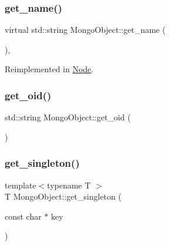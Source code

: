 \mbox{\label{class_mongo_object_abd49d2dcea0ce5f49ebe9a8a9df97164}} 
\subsubsection{\texorpdfstring{get\+\_\+name()}{get\_name()}}
{\footnotesize\ttfamily virtual std\+::string Mongo\+Object\+::get\+\_\+name (\begin{DoxyParamCaption}{ }\end{DoxyParamCaption})\hspace{0.3cm}{\ttfamily [inline]}, {\ttfamily [virtual]}}



Reimplemented in \hyperlink{class_node_a0cc0386322fca056e49e49d869ade853}{Node}.

\mbox{\label{class_mongo_object_ad155a8808f999f8e3dd0cfc055b33e2a}} 
\subsubsection{\texorpdfstring{get\+\_\+oid()}{get\_oid()}}
{\footnotesize\ttfamily std\+::string Mongo\+Object\+::get\+\_\+oid (\begin{DoxyParamCaption}{ }\end{DoxyParamCaption})}

\mbox{\label{class_mongo_object_af0cf1568e5b1b87a971e93bba4ec0a40}} 
\subsubsection{\texorpdfstring{get\+\_\+singleton()}{get\_singleton()}}
{\footnotesize\ttfamily template$<$typename T $>$ \\
T Mongo\+Object\+::get\+\_\+singleton (\begin{DoxyParamCaption}\item[{const char $\ast$}]{key }\end{DoxyParamCaption})\hspace{0.3cm}{\ttfamily [inline]}}


